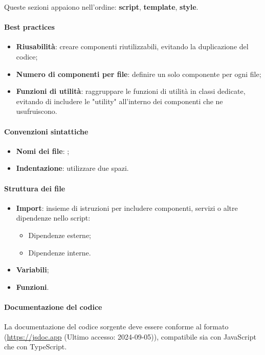 \vspace{0.5\baselineskip}
\par Queste sezioni appaiono nell'ordine: \textbf{script}, \textbf{template}, \textbf{style}.

\paragraph*{Best practices}
\begin{itemize}
  \item \textbf{Riusabilità}: creare componenti riutilizzabili, evitando la duplicazione del codice;
  \item \textbf{Numero di componenti per file}: definire un solo componente per ogni file;
  \item \textbf{Funzioni di utilità}: raggruppare le funzioni di utilità in classi dedicate, evitando di includere le "utility" all'interno dei componenti che ne usufruiscono.
\end{itemize}

\paragraph*{Convenzioni sintattiche}
\begin{itemize}
  \item \textbf{Nomi dei file}: ;
  \item \textbf{Indentazione}: utilizzare due spazi.
\end{itemize}

\paragraph*{Struttura dei file}
\begin{itemize}
  \item \textbf{Import}: insieme di istruzioni per includere componenti, servizi o altre dipendenze nello script:
  \begin{itemize}
    \item Dipendenze esterne;
    \item Dipendenze interne.
  \end{itemize}
  \item \textbf{Variabili};
  \item \textbf{Funzioni}.
\end{itemize}

\paragraph*{Documentazione del codice}
\vspace{0.5\baselineskip}
\par La documentazione del codice sorgente deve essere conforme al formato  (\href{https://jsdoc.app}{https://jsdoc.app} (Ultimo accesso: 2024-09-05)), compatibile sia con JavaScript che con TypeScript.

